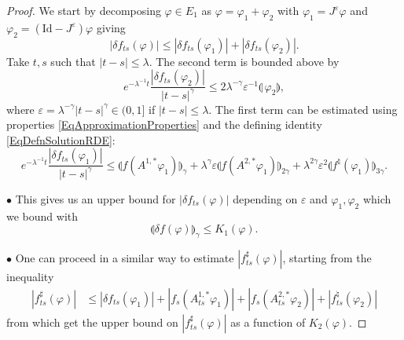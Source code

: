 \documentclass[11pt,a4paper]{amsart}
\renewcommand{\leq}{\leqslant}
\theoremstyle{plain}%
\theoremstyle{definition}
\theoremstyle{remark}
\numberwithin{equation}{section} %
\begin{document}
\begin{proof}
We start by decomposing $\varphi\in E_1$ as $\varphi = \varphi_1 + \varphi_2$ with $\varphi_1 = J^\varepsilon \varphi$ and $\varphi_2 = (\textrm{Id}-J^\varepsilon) \varphi$ giving
$$
|\delta f_{ts}(\varphi)| \leq |\delta f_{ts}(\varphi_1)| + |\delta f_{ts}(\varphi_2)|.
$$
Take $t,s$ such that ${|t-s|\le \lambda}$. The second term is bounded above by 
$$
e^{-\lambda^{-1}t} \frac{|\delta f_{ts}(\varphi_2)|}{|t-s|^\gamma} \leq  2 \lambda^{-\gamma}\varepsilon^{-1}\llparenthesis\, \varphi_2 \rrparenthesis ,
$$ 
where  $\varepsilon = \lambda^{-\gamma} | t - s |^\gamma \in(0,1]$ if $|t-s|\le \lambda$.
The first term can be estimated using properties \eqref{EqApproximationProperties} and the defining identity \eqref{EqDefnSolutionRDE}:
$$
e^{-\lambda^{-1}t} \frac{|\delta f_{ts}(\varphi_1)|}{|t-s|^\gamma} \leq
\llparenthesis  f(A^{1,*} \varphi_1) \rrparenthesis_\gamma
+ \lambda^{\gamma} \varepsilon  \llparenthesis f( A^{2,*} \varphi_1) \rrparenthesis_{2\gamma}  
+ \lambda^{2\gamma}\varepsilon^2 \llparenthesis f^\natural (  \varphi_1) \rrparenthesis_{3\gamma}.
$$ 

\medskip

$\bullet$  This gives us an upper bound for $|\delta f_{ts}(\varphi)|$ depending on $\varepsilon$ and $\varphi_1, \varphi_2$ which we bound with
\begin{equation*}
\llparenthesis \delta f(\varphi) \rrparenthesis_\gamma \leq  K_1(\varphi) .
\end{equation*}

\smallskip

$\bullet$ One can proceed in a similar way to estimate $|f^\sharp_{ts}(\varphi)|$, starting from the inequality
\begin{equation*}
\begin{split}
| f^\sharp_{ts}(\varphi)| &\leq | \delta f_{ts}(\varphi_1)| + | f_s(A^{1,*}_{ts}\varphi_1)| + | f_s(A^{2,*}_{ts}\varphi_2)| + |f^\natural_{ts}(\varphi_2)|
\end{split}
\end{equation*}
from which get the upper bound on $|f^\sharp_{ts}(\varphi)|$ as a function of $K_2(\varphi)$.
\end{proof}

\medskip
\end{document}
